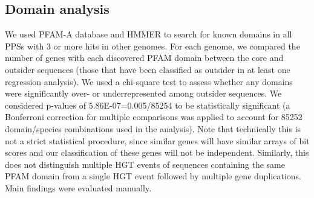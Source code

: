 \subsection{Domain analysis}
\label{domain_analysis}
We used PFAM-A \cite{Finn2014} database and HMMER \cite{Prakash2017} to search
for known domains in all PPSs with 3 or more hits in other genomes.  For each
genome, we compared the number of genes with each discovered PFAM domain
between the core and outsider sequences (those that have been classified as
outsider in at least one regression analysis).  We used a chi-square test to
assess whether any domains were significantly over- or underrepresented among
outsider sequences. We considered p-values of 5.86E-07=0.005/85254 to
be statistically significant (a Bonferroni correction for multiple comparisons
was applied to account for 85252 domain/species combinations used in the
analysis). Note that technically this is not a strict statistical procedure,
since similar genes will have similar arrays of bit scores and our
classification of these genes will not be independent. Similarly, this does not
distinguish multiple HGT events of sequences containing the same PFAM domain
from a single HGT event followed by multiple gene duplications. Main findings
were evaluated manually.
